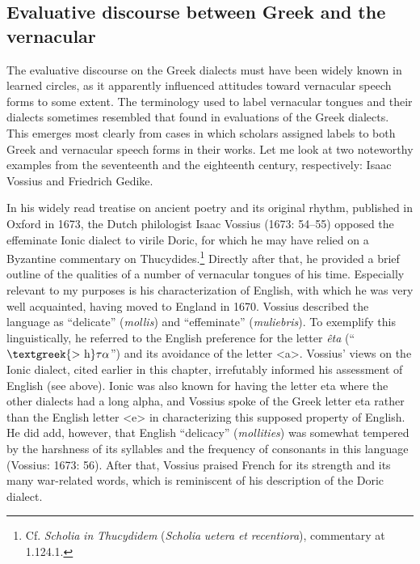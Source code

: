 \documentclass[output=paper]{langsci/langscibook}
\begin{document}
\subsection{Evaluative discourse between Greek and the vernacular}
\hypertarget{Toc19704852}{}
The evaluative discourse on the Greek dialects must have been widely known in learned circles, as it apparently influenced attitudes toward vernacular speech forms to some extent. The terminology used to label vernacular tongues and their dialects sometimes resembled that found in evaluations of the Greek dialects. This emerges most clearly from cases in which scholars assigned labels to both Greek and vernacular speech forms in their works. Let me look at two noteworthy examples from the seventeenth and the eighteenth century, respectively: Isaac Vossius and Friedrich Gedike.

In his widely read treatise on ancient poetry and its original rhythm, published in Oxford in 1673, the Dutch philologist Isaac Vossius (1673: 54–55) opposed the effeminate Ionic dialect to virile Doric, for which he may have relied on a Byzantine commentary on Thucydides.\footnote{Cf. \textit{Scholia} \textit{in} \textit{Thucydidem} (\textit{Scholia} \textit{uetera} \textit{et} \textit{recentiora}), commentary at 1.124.1.} Directly after that, he provided a brief outline of the qualities of a number of vernacular tongues of his time. Especially relevant to my purposes is his characterization of English, with which he was very well acquainted, having moved to England in 1670. Vossius described the language as “delicate” (\textit{mollis}) and “effeminate” (\textit{muliebris}). To exemplify this linguistically, he referred to the English preference for the letter \textit{êta} (“$\text{\textgreek{>~h}}\tau \alpha $”) and its avoidance of the letter <a>. Vossius’ views on the Ionic dialect, cited earlier in this chapter, irrefutably informed his assessment of English (see  above). Ionic was also known for having the letter eta where the other dialects had a long alpha, and Vossius spoke of the Greek letter eta rather than the English letter <e> in characterizing this supposed property of English. He did add, however, that English “delicacy” (\textit{mollities}) was somewhat tempered by the harshness of its syllables and the frequency of consonants in this language (Vossius: 1673: 56). After that, Vossius praised French for its strength and its many war-related words, which is reminiscent of his description of the Doric dialect.
\end{document}
